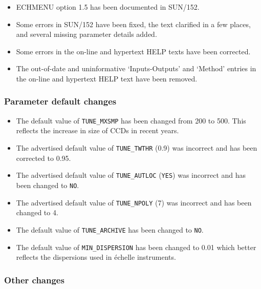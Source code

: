 \documentclass[11pt,twoside]{article}
\newcommand{\htmlref}[2]{#1}
\begin{document}
\begin{itemize}
\item ECHMENU option 1.5 has been documented in SUN/152.
\item Some errors in SUN/152 have been fixed, the text clarified in
   a few places, and several missing parameter details added.
\item Some errors in the on-line and hypertext HELP texts have been
   corrected.
\item The out-of-date and uninformative `Inputs-Outputs' and `Method'
   entries in the on-line and hypertext HELP text have been removed.
\end{itemize}

\subsubsection{Parameter default changes}

\begin{itemize}
\item The default value of \htmlref{{\tt{TUNE\_MXSMP}}}{par_TUNE_MXSMP}
   has been changed from 200 to 500.
   This reflects the increase in size of CCDs in recent years.
\item The advertised default value of
   \htmlref{{\tt{TUNE\_TWTHR}}}{par_TUNE_TWTHR} (0.9) was incorrect and
   has been corrected to 0.95.
\item The advertised default value of
   \htmlref{{\tt{TUNE\_AUTLOC}}}{par_TUNE_AUTLOC} (\texttt{YES}) was
   incorrect and has been changed to \texttt{NO}.
\item The advertised default value of
   \htmlref{{\tt{TUNE\_NPOLY}}}{par_TUNE_NPOLY}
   (7) was incorrect and has been changed to 4.
\item The default value of \htmlref{{\tt{TUNE\_ARCHIVE}}}{par_TUNE_ARCHIVE}
   has been changed to \texttt{NO}.
\item The default value of \htmlref{{\tt{MIN\_DISPERSION}}}{par_MIN_DISPERSION}
   has been changed to 0.01 which better reflects the dispersions used in
   \'{e}chelle instruments.
\end{itemize}

\subsubsection{Other changes}
\end{document}
